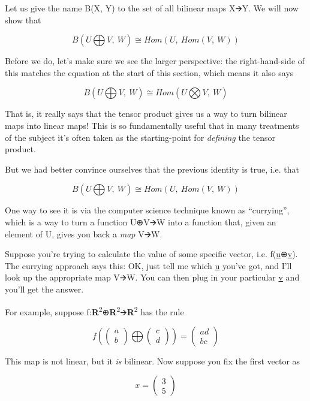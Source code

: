 \documentclass[oneside,english]{amsbook}
\numberwithin{section}{chapter}
\theoremstyle{plain}
\theoremstyle{definition}
\begin{document}
Let us give the name B(X, Y) to the set of all bilinear maps X🡪Y. We
will now show that

\[B(U\bigoplus V,\ W) \cong Hom(U,\ Hom(V,\ W))\]

Before we do, let's make sure we see the larger perspective: the
right-hand-side of this matches the equation at the start of this
section, which means it also says

\[B(U\bigoplus V,\ W) \cong Hom(U\bigotimes V,\ W)\]

That is, it really says that the tensor product gives us a way to turn
bilinear maps into linear maps! This is so fundamentally useful that in
many treatments of the subject it's often taken as the starting-point
for \emph{defining} the tensor product.

But we had better convince ourselves that the previous identity is true,
i.e. that

\[B(U\bigoplus V,\ W) \cong Hom(U,\ Hom(V,\ W))\]

One way to see it is via the computer science technique known as
``currying'', which is a way to turn a function U⊕V🡪W into a function
that, given an element of U, gives you back a \emph{map} V🡪W.

Suppose you're trying to calculate the value of some specific vector,
i.e. f(\ul{u}⊕\ul{v}). The currying approach says this: OK, just tell me
which \ul{u} you've got, and I'll look up the appropriate map V🡪W. You
can then plug in your particular \ul{v} and you'll get the answer.

For example, suppose
f:\textbf{R}\textsuperscript{2}⊕\textbf{R}\textsuperscript{2}🡪\textbf{R}\textsuperscript{2}
has the rule

\[f\left( \begin{pmatrix}
	a \\
	b
\end{pmatrix}\bigoplus\begin{pmatrix}
	c \\
	d
\end{pmatrix} \right) = \begin{pmatrix}
	ad \\
	bc
\end{pmatrix}\]

This map is not linear, but it \emph{is} bilinear. Now suppose you fix
the first vector as

\[x = \begin{pmatrix}
	3 \\
	5
\end{pmatrix}\]
\end{document}

